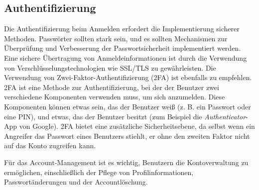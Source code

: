 \subsection{Authentifizierung}


Die Authentifizierung beim Anmelden erfordert die Implementierung sicherer Methoden. Passwörter sollten stark sein, und es sollten Mechanismen zur Überprüfung und Verbesserung der Passwortsicherheit implementiert werden. Eine sichere Übertragung von Anmeldeinformationen ist durch die Verwendung von Verschlüsselungstechnologien wie SSL/TLS zu gewährleisten. Die Verwendung von Zwei-Faktor-Authentifizierung (2FA) ist ebenfalls zu empfehlen. 2FA ist eine Methode zur Authentifizierung, bei der der Benutzer zwei verschiedene Komponenten verwenden muss, um sich anzumelden. Diese Komponenten können etwas sein, das der Benutzer weiß (z. B. ein Passwort oder eine PIN), und etwas, das der Benutzer besitzt (zum Beispiel die \textit{Authenticator}-App von Google). 2FA bietet eine zusätzliche Sicherheitsebene, da selbst wenn ein Angreifer das Passwort eines Benutzers stiehlt, er ohne den zweiten Faktor nicht auf das Konto zugreifen kann. 

Für das Account-Management ist es wichtig, Benutzern die Kontoverwaltung zu ermöglichen, einschließlich der Pflege von Profilinformationen, Passwortänderungen und der Accountlöschung.

